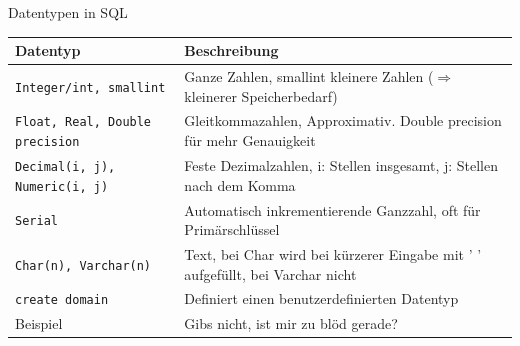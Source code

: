 \documentclass{article}
\begin{document}
\begin{block}{Datentypen in SQL}
  \begin{center}
    \begin{tabular}{|p{4cm}|p{7cm}|}
      \hline
      \textbf{Datentyp} & \textbf{Beschreibung} \\
      \hline
      \texttt{Integer/int, smallint} & Ganze Zahlen, smallint kleinere Zahlen ($\Rightarrow$ kleinerer Speicherbedarf) \\
      \hline
      \texttt{Float, Real, Double precision} & Gleitkommazahlen, Approximativ. Double precision für mehr Genauigkeit \\
      \hline
      \texttt{Decimal(i, j), Numeric(i, j)} & Feste Dezimalzahlen, i: Stellen insgesamt, j: Stellen nach dem Komma \\
      \hline
      \texttt{Serial} & Automatisch inkrementierende Ganzzahl, oft für Primärschlüssel \\
      \hline
      \texttt{Char(n), Varchar(n)} & Text, bei Char wird bei kürzerer Eingabe mit ' ' aufgefüllt, bei Varchar nicht \\
      \hline
      \texttt{create domain} & Definiert einen benutzerdefinierten Datentyp \\
      \hline
      Beispiel & Gibs nicht, ist mir zu blöd gerade? \\
      \hline
    \end{tabular}
  \end{center}
\end{block}
\end{document}
